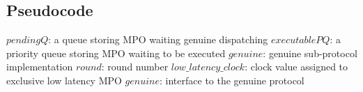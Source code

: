 \documentclass[a4paper, 10pt]{article}
\newcommand{\IndentState}{\State\hspace{\algorithmicindent}}
\begin{document}
\subsection{Pseudocode}

\begin{algorithmic}[1]
    \small
    \Variables
        \State $pendingQ$: a queue storing MPO waiting genuine dispatching
        \State $executablePQ$: a priority queue storing MPO waiting to be executed
        \State $genuine$: genuine sub-protocol implementation
        \State $round$: round number
        \State $low\_latency\_clock$: clock value assigned to exclusive low latency MPO
        \State $genuine$: interface to the genuine protocol
    \EndVariables


\end{algorithmic}
\end{document}

